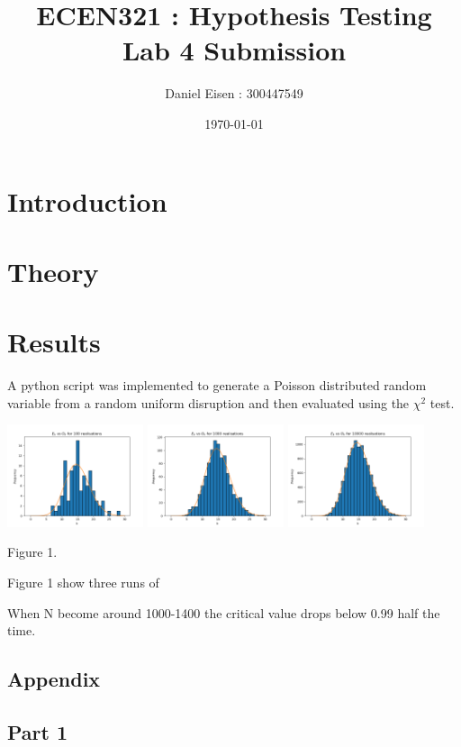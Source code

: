 \documentclass[11pt]{article}
\title{ECEN321 : Hypothesis Testing \\ Lab 4 Submission}
\author{Daniel Eisen : 300447549}
\date{\today}
\newcommand{\Newpage}{\end{preview}\begin{preview}}
\begin{document}
\begin{preview}
\maketitle
\section{Introduction}

\section{Theory}

\section{Results}
A python script was implemented to generate a Poisson distributed random variable from a random uniform disruption and then evaluated using the $\chi^2$ test.

\includegraphics[width=0.3\textwidth]{inc/100.png}
\includegraphics[width=0.3\textwidth]{inc/1000.png}
\includegraphics[width=0.3\textwidth]{inc/10000.png}
\begin{center}
        Figure 1.
\end{center}

Figure 1 show three runs of


When N become around 1000-1400 the critical value drops below 0.99 half the time. 

\Newpage
\section*{Appendix}
\subsection*{Part 1}

\end{preview}
\end{document}
